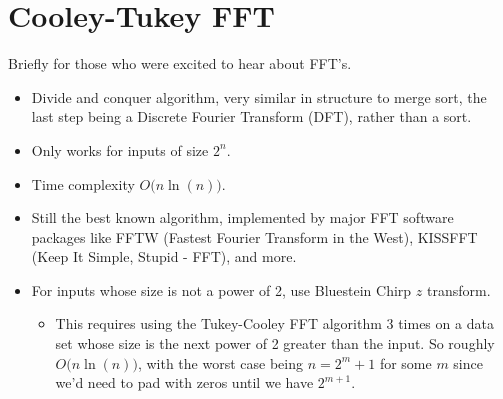 \documentclass{article}
\begin{document}
    \section*{Cooley-Tukey FFT}
        Briefly for those who were excited to hear about FFT's.
        \begin{itemize}
            \item Divide and conquer algorithm, very similar in structure to merge sort,
                  the last step being a Discrete Fourier Transform (DFT), rather than a sort.
            \item Only works for inputs of size $2^{n}$.
            \item Time complexity $O\big(n\ln(n)\big)$.
            \item Still the best known algorithm, implemented by major FFT software packages like
                  FFTW (Fastest Fourier Transform in the West), KISSFFT
                  (Keep It Simple, Stupid - FFT), and more.
            \item For inputs whose size is not a power of 2, use Bluestein Chirp $z$ transform.
            \begin{itemize}
                \item This requires using the Tukey-Cooley FFT algorithm 3 times on a data set whose
                      size is the next power of 2 greater than the input. So roughly $O\big(n\ln(n)\big)$,
                      with the worst case being $n=2^{m}+1$ for some $m$ since we'd need to pad with zeros
                      until we have $2^{m+1}$.
            \end{itemize}
        \end{itemize}
\end{document}
